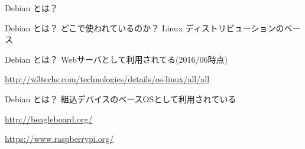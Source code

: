 \begin{frame}{Debian とは？}
  \begin{center}
  \end{center}
\end{frame}

\begin{frame}{Debian とは？}
どこで使われているのか？\pause
Linux ディストリビューションのベース

  \begin{center}
  \end{center}

\end{frame}

\begin{frame}{Debian とは？}
Webサーバとして利用されてる(2016/06時点)

  \begin{center}
  \end{center}
  \tiny{\url{http://w3techs.com/technologies/details/os-linux/all/all}}

\end{frame}

\begin{frame}{Debian とは？}
組込デバイスのベースOSとして利用されている

 \begin{center}
 \end{center}
 \url{http://beagleboard.org/}

 \begin{center}
 \end{center}
 \url{https://www.raspberrypi.org/}

 \end{frame}

